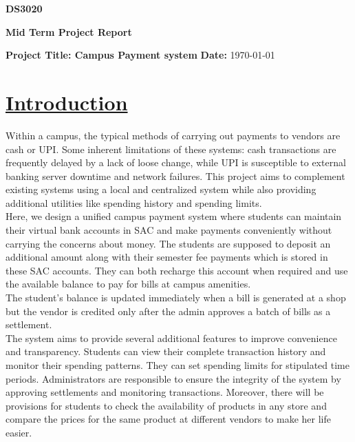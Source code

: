 \documentclass[a4paper,12pt]{article}
\begin{document}
\begin{center}
    \textbf{\Large DS3020}
    
    \vspace{0.5cm}
    
    \textbf{\Large Mid Term Project Report}
\end{center}
\vspace{0.5cm}

\noindent
\textbf{{Project Title}: Campus Payment system} \hfill \textbf{Date:} \today

\vspace{0.5cm}

\hline

\vspace{0.5cm}

\section*{\underline{Introduction}}
Within a campus, the typical methods of carrying out payments to vendors are cash or UPI. Some inherent limitations of these systems: cash transactions are frequently delayed by a lack of loose change, while UPI is susceptible to external banking server downtime and network failures. This project aims to complement existing systems using a local and centralized system while also providing additional utilities like spending history and spending limits.\\

Here, we design a unified campus payment system where students can maintain their virtual bank accounts in SAC and make payments conveniently without carrying the concerns about money. The students are supposed to deposit an additional amount along with their semester fee payments which is stored in these SAC accounts. They can both recharge this account when required and use the available balance to pay for bills at campus amenities. \\
The student's balance is updated immediately when a bill is generated at a shop but the vendor is credited only after the admin approves a batch of bills as a settlement.\\

The system aims to provide several additional features to improve convenience and transparency. Students can view their complete transaction history and monitor their spending patterns. They can set spending limits for stipulated time periods. Administrators are responsible to ensure the integrity of the system by approving settlements and monitoring transactions. Moreover, there will be provisions for students to check the availability of products in any store and compare the prices for the same product at different vendors to make her life easier.
\end{document}
